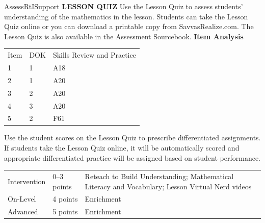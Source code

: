 \documentclass{article}
\newenvironment{te-addendum}[2]{}{}     %
\begin{document}
\begin{te-addendum}{Assess}{RtISupport}
\textbf{LESSON QUIZ}
Use the Lesson Quiz to assess students' understanding of the mathematics in the lesson.
Students can take the Lesson Quiz online or you can download a printable copy from SavvasRealize.com. The Lesson Quiz is also available in the Assessment Sourcebook.
\textbf{Item Analysis}
\begin{tabular}{lll}
Item & DOK & Skills Review and Practice \\
1 & 1 & A18 \\
2 & 1 & A20 \\
3 & 2 & A20 \\
4 & 3 & A20 \\
5 & 2 & F61 \\
\end{tabular}
Use the student scores on the Lesson Quiz to prescribe differentiated assignments.
If students take the Lesson Quiz online, it will be automatically scored and appropriate differentiated practice will be assigned based on student performance.
\begin{tabular}{lll}
Intervention & 0--3 points & Reteach to Build Understanding; Mathematical Literacy and Vocabulary; Lesson Virtual Nerd videos \\
On-Level & 4 points & Enrichment \\
Advanced & 5 points & Enrichment \\
\end{tabular}
\end{te-addendum}
\end{document}

